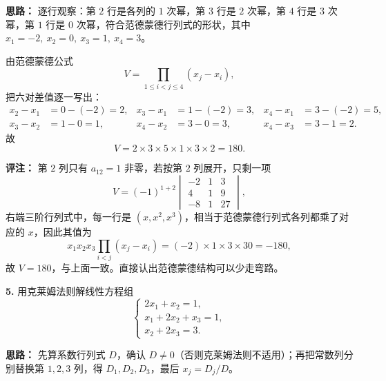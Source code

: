 \ifshowsolutions%
\textbf{思路：} 逐行观察：第 $2$ 行是各列的 $1$ 次幂，第 $3$ 行是 $2$ 次幂，第 $4$ 行是 $3$ 次幂，第 $1$ 行是 $0$ 次幂，符合范德蒙德行列式的形状，其中 $x_1=-2,\ x_2=0,\ x_3=1,\ x_4=3$。

由范德蒙德公式
\[
V=\prod_{1\le i<j\le 4}(x_j-x_i),
\]
把六对差值逐一写出：
\[
\begin{aligned}
x_2-x_1&=0-(-2)=2, & x_3-x_1&=1-(-2)=3, & x_4-x_1&=3-(-2)=5,\\
x_3-x_2&=1-0=1, & x_4-x_2&=3-0=3, & x_4-x_3&=3-1=2.
\end{aligned}
\]
故
\[
V=2\times3\times5\times1\times3\times2=180.
\]

\textbf{评注：} 第 $2$ 列只有 $a_{12}=1$ 非零，若按第 $2$ 列展开，只剩一项
\[
V=(-1)^{1+2}\begin{vmatrix}-2&1&3\\4&1&9\\-8&1&27\end{vmatrix},
\]
右端三阶行列式中，每一行是 $(x,x^{2},x^{3})$，相当于范德蒙德行列式各列都乘了对应的 $x$，因此其值为
\[
x_1x_2x_3\prod_{i<j}(x_j-x_i)=(-2)\times1\times3\times30=-180,
\]
故 $V=180$，与上面一致。直接认出范德蒙德结构可以少走弯路。


\else \answerarea[6] \fi%

\textbf{5.} 用克莱姆法则解线性方程组
\[
\begin{cases}
2x_1+x_2=1,\\
x_1+2x_2+x_3=1,\\
x_2+2x_3=3.
\end{cases}
\]

\ifshowsolutions%
\textbf{思路：} 先算系数行列式 $D$，确认 $D\neq0$（否则克莱姆法则不适用）；再把常数列分别替换第 $1,2,3$ 列，得 $D_1,D_2,D_3$，最后 $x_j=D_j/D$。

